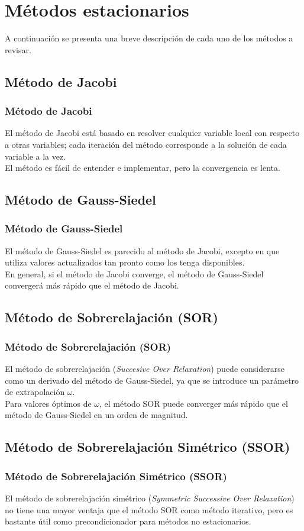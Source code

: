 \section{Métodos estacionarios}
\begin{frame}
A continuación se presenta una breve descripción de cada uno de los métodos a revisar.
\end{frame}
\subsection{Método de Jacobi}
\begin{frame}
\frametitle{Método de Jacobi}
El método de Jacobi está basado en resolver cualquier variable local con respecto a otras variables; cada iteración del método corresponde a la solución de cada variable a la vez. 
\\
\bigskip
El método es fácil de entender e implementar, pero la convergencia es lenta.
\end{frame}
\subsection{Método de Gauss-Siedel}
\begin{frame}
\frametitle{Método de {Gauss-Siedel}}
El método de Gauss-Siedel es parecido al método de Jacobi, excepto en que utiliza valores actualizados tan pronto como los tenga disponibles. 
\\
\bigskip
En general, si el método de Jacobi converge, el método de Gauss-Siedel convergerá más rápido que el método de Jacobi.
\end{frame}
\subsection{Método de Sobrerelajación (SOR)}
\begin{frame}
\frametitle{Método de Sobrerelajación (SOR)}
El método de sobrerelajación (\textit{Succesive Over Relaxation}) puede considerarse como un derivado del método de Gauss-Siedel, ya que se introduce un parámetro de extrapolación $\omega$. 
\\
\bigskip
Para valores óptimos de $\omega$, el método SOR puede converger más rápido que el método de Gauss-Siedel en un orden de magnitud.
\end{frame}
\subsection{Método de Sobrerelajación Simétrico (SSOR)}
\begin{frame}
\frametitle{Método de Sobrerelajación Simétrico (SSOR)}
El método de sobrerelajación simétrico (\textit{Symmetric Successive Over Relaxation}) no tiene una mayor ventaja que el método SOR como método iterativo, pero es bastante útil como precondicionador para métodos no estacionarios.
\end{frame}
